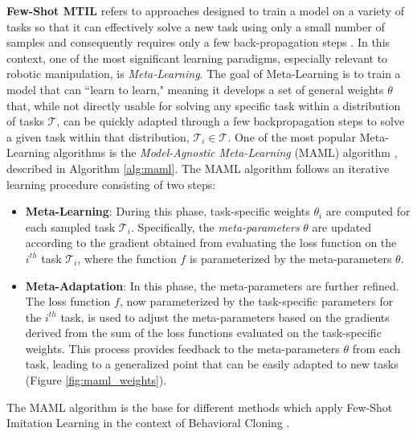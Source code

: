 \textbf{Few-Shot MTIL} refers to approaches designed to train a model on a variety of tasks so that it can effectively solve a new task using only a small number of samples and consequently requires only a few back-propagation steps \cite{finn2017maml}. In this context, one of the most significant learning paradigms, especially relevant to robotic manipulation, is \textit{Meta-Learning}. The goal of Meta-Learning is to train a model that can ``learn to learn," meaning it develops a set of general weights $\theta$ that, while not directly usable for solving any specific task within a distribution of tasks $\mathcal{T}$, can be quickly adapted through a few backpropagation steps to solve a given task within that distribution, $\mathcal{T}_{i} \in \mathcal{T}$. One of the most popular Meta-Learning algorithms is the \textit{Model-Agnostic Meta-Learning} (MAML) algorithm \cite{finn2017maml}, described in Algorithm \ref{alg:maml}. The MAML algorithm follows an iterative learning procedure consisting of two steps:
\begin{itemize}
    \item \textbf{Meta-Learning}: During this phase, task-specific weights $\theta_{i}$ are computed for each sampled task $\mathcal{T}_{i}$. Specifically, the \textit{meta-parameters} $\theta$ are updated according to the gradient obtained from evaluating the loss function on the $i^{th}$ task $\mathcal{T}_{i}$, where the function $f$ is parameterized by the meta-parameters $\theta$.

    \item \textbf{Meta-Adaptation}: In this phase, the meta-parameters are further refined. The loss function $f$, now parameterized by the task-specific parameters for the $i^{th}$ task, is used to adjust the meta-parameters based on the gradients derived from the sum of the loss functions evaluated on the task-specific weights. This process provides feedback to the meta-parameters $\theta$ from each task, leading to a generalized point that can be easily adapted to new tasks (Figure \ref{fig:maml_weights}).
\end{itemize}


The MAML algorithm is the base for different methods which apply Few-Shot Imitation Learning in the context of Behavioral Cloning \cite{finn2017one_shot_visual_il,yu2018daml,yu2018one_shot_hil}.

